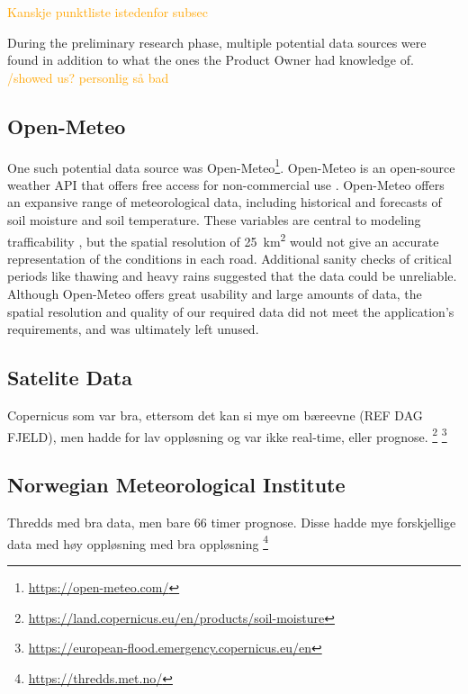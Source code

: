 \textcolor{orange}{Kanskje punktliste istedenfor subsec}

During the preliminary research phase, multiple potential data sources were found in addition to what the ones the Product Owner had knowledge of. \textcolor{orange}{/showed us? personlig så bad}

\subsection{Open-Meteo}

One such potential data source was Open-Meteo\footnote{\url{https://open-meteo.com/}}. Open-Meteo is an open-source weather API that offers free access for non-commercial use \cite{openmeteo}. Open-Meteo offers an expansive range of meteorological data, including historical and forecasts of soil moisture and soil temperature. These variables are central to modeling trafficability \cite{fjeld2023trafficability}, but the spatial resolution of \qty{25}{\kilo\meter\squared} would not give an accurate representation of the conditions in each road. Additional sanity checks of critical periods like thawing and heavy rains suggested that the data could be unreliable. Although Open-Meteo offers great usability and large amounts of data, the spatial resolution and quality of our required data did not meet the application's requirements, and was ultimately left unused. 

\subsection{Satelite Data}

Copernicus som var bra, ettersom det kan si mye om bæreevne (REF DAG FJELD), men hadde for lav oppløsning og var ikke real-time, eller prognose.
\footnote{\url{https://land.copernicus.eu/en/products/soil-moisture}}
\footnote{\url{https://european-flood.emergency.copernicus.eu/en}}

\subsection{Norwegian Meteorological Institute}

Thredds med bra data, men bare 66 timer prognose. Disse hadde mye forskjellige data med høy oppløsning med bra oppløsning
\footnote{\url{https://thredds.met.no/}}
